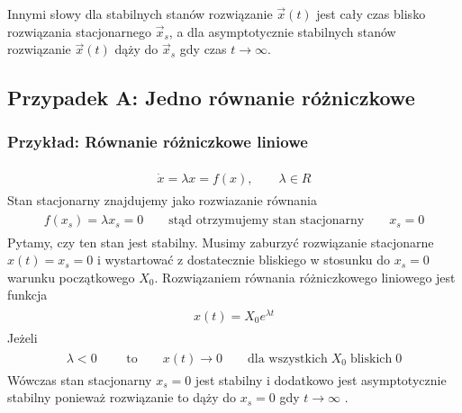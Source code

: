 \documentclass[a4paper,12pt,polish]{sphinxmanual}
\begin{document}
Innymi słowy dla stabilnych stanów rozwiązanie $\vec x(t)$ jest cały czas blisko rozwiązania stacjonarnego $\vec x_s$, a dla asymptotycznie stabilnych stanów rozwiązanie $\vec x(t)$ dąży do $\vec x_s$  gdy czas $t\to \infty$.


\subsection{Przypadek A: Jedno równanie różniczkowe}
\label{ch1/chI023:przypadek-a-jedno-rownanie-rozniczkowe}

\subsubsection{Przykład: Równanie różniczkowe liniowe}
\label{ch1/chI023:przyklad-rownanie-rozniczkowe-liniowe}\label{ch1/chI023:equation-eqn5}\begin{gather}
\begin{split}\dot x = \lambda x = f(x), \qquad \lambda  \in R\end{split}\label{ch1/chI023-eqn5}
\end{gather}
Stan stacjonarny znajdujemy jako rozwiazanie równania
\label{ch1/chI023:equation-eqn6}\begin{gather}
\begin{split}f(x_s) = \lambda x_s =0 \qquad \mbox{stąd otrzymujemy stan stacjonarny} \qquad x_s = 0\end{split}\label{ch1/chI023-eqn6}
\end{gather}
Pytamy, czy ten stan jest stabilny. Musimy zaburzyć rozwiązanie stacjonarne $x(t) = x_s = 0$ i wystartować z dostatecznie bliskiego w stosunku do $x_s=0$ warunku początkowego $X_0$. Rozwiązaniem równania różniczkowego liniowego jest funkcja
\label{ch1/chI023:equation-eqn7}\begin{gather}
\begin{split}x(t) = X_0 e^{\lambda t}\end{split}\label{ch1/chI023-eqn7}
\end{gather}
Jeżeli
\label{ch1/chI023:equation-eqn8}\begin{gather}
\begin{split}\lambda  < 0  \quad \quad \mbox{ to} \quad \quad x(t) \to 0 \quad \quad \mbox{dla wszystkich}  \;   X_0  \;  \mbox{bliskich} \; 0\end{split}\label{ch1/chI023-eqn8}
\end{gather}
Wówczas stan stacjonarny $x_s=0$ jest stabilny i dodatkowo jest asymptotycznie stabilny ponieważ rozwiązanie to dąży do $x_s =0$  gdy  $t\to \infty$ .
\end{document}
